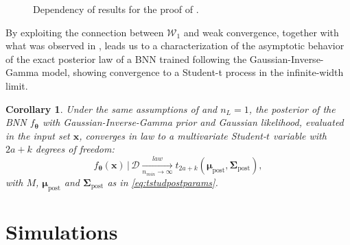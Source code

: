 \documentclass[a4paper, 11pt, reqno]{amsart}
\theoremstyle{plain}
\newtheorem{corollary}[theorem]{Corollary}
\theoremstyle{remark}
\theoremstyle{definition}
\newcommand{\given}{\, | \,}
\newcommand{\tstud}[3]{t_{#1}\left(#2, #3\right)}
\newcommand{\train}{\mathcal{D}}
\begin{document}
\begin{figure}[H]
\begin{centering}
{}
		\caption{Dependency of results for the proof of .}
		\label{fig:chartmain}
	\end{centering}
\end{figure}

By exploiting the connection between $\mathcal{W}_1$ and weak convergence, together with what was observed in ,  leads us to a characterization of the asymptotic behavior of the exact posterior law of a BNN trained following the Gaussian-Inverse-Gamma model, showing convergence to a Student-t process in the infinite-width limit.

\begin{corollary} \label{cor:studposterior}
    Under the same assumptions of  and $n_L = 1$, the posterior of the BNN $f_{\bm{\theta}}$ with Gaussian-Inverse-Gamma prior and Gaussian likelihood, evaluated in the input set $\bm{x}$, converges in law to a multivariate Student-$t$ variable with $2a+k$ degrees of freedom:
    \begin{equation*}
        f_{\bm{\theta}}(\bm{x}) \given \train \xrightarrow[n_{min} \to \infty]{law} \tstud{2a + k}{\bm{\mu}_{\mathrm{post}}}{\bm{\Sigma}_{\mathrm{post}}},
    \end{equation*}
    with $M$, $\bm{\mu}_{\mathrm{post}}$ and $\bm{\Sigma}_{\mathrm{post}}$ as in \cref{eq:tstudpostparams}.
\end{corollary}

\section{Simulations} \label{sec:simulations}
\end{document}

